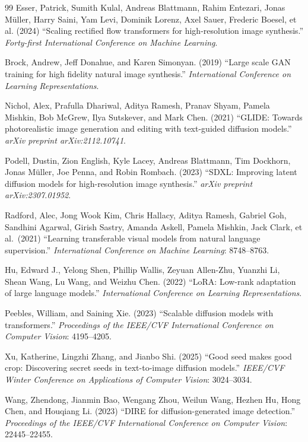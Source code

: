 \documentclass[3p,times,procedia]{elsarticle}
\begin{document}
\begin{thebibliography}{99}
Esser, Patrick, Sumith Kulal, Andreas Blattmann, Rahim Entezari, Jonas
M\"{u}ller, Harry Saini, Yam Levi, Dominik Lorenz, Axel Sauer, Frederic
Boesel, et al. (2024) ``Scaling rectified flow transformers for
high-resolution image synthesis.'' \textit{Forty-first International
Conference on Machine Learning}.

Brock, Andrew, Jeff Donahue, and Karen Simonyan. (2019) ``Large scale GAN
training for high fidelity natural image synthesis.'' \textit{International
Conference on Learning Representations}.

Nichol, Alex, Prafulla Dhariwal, Aditya Ramesh, Pranav Shyam, Pamela
Mishkin, Bob McGrew, Ilya Sutskever, and Mark Chen. (2021) ``GLIDE:
Towards photorealistic image generation and editing with text-guided
diffusion models.'' \textit{arXiv preprint arXiv:2112.10741}.

Podell, Dustin, Zion English, Kyle Lacey, Andreas Blattmann, Tim Dockhorn,
Jonas M\"{u}ller, Joe Penna, and Robin Rombach. (2023) ``SDXL: Improving
latent diffusion models for high-resolution image synthesis.''
\textit{arXiv preprint arXiv:2307.01952}.

Radford, Alec, Jong Wook Kim, Chris Hallacy, Aditya Ramesh, Gabriel Goh,
Sandhini Agarwal, Girish Sastry, Amanda Askell, Pamela Mishkin, Jack Clark,
et al.\ (2021) ``Learning transferable visual models from natural language
supervision.'' \textit{International Conference on Machine Learning}:
8748--8763.

Hu, Edward J., Yelong Shen, Phillip Wallis, Zeyuan Allen-Zhu, Yuanzhi Li,
Shean Wang, Lu Wang, and Weizhu Chen. (2022) ``LoRA: Low-rank adaptation of
large language models.'' \textit{International Conference on Learning
Representations}.


Peebles, William, and Saining Xie. (2023) ``Scalable diffusion models with
transformers.'' \textit{Proceedings of the IEEE/CVF International
Conference on Computer Vision}: 4195--4205.


Xu, Katherine, Lingzhi Zhang, and Jianbo Shi. (2025) ``Good seed makes
good crop: Discovering secret seeds in text-to-image diffusion models.''
\textit{IEEE/CVF Winter Conference on Applications of Computer Vision}:
3024--3034.

Wang, Zhendong, Jianmin Bao, Wengang Zhou, Weilun Wang, Hezhen Hu, Hong
Chen, and Houqiang Li. (2023) ``DIRE for diffusion-generated image
detection.'' \textit{Proceedings of the IEEE/CVF International Conference
on Computer Vision}: 22445--22455.


\end{thebibliography}
\end{document}
